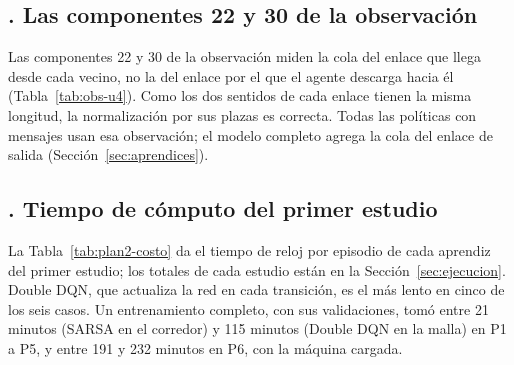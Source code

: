 \subsection*{\theanexoIapartado. Las componentes 22 y 30 de la observación}
\label{sec:componentes-obs}

Las componentes 22 y 30 de la observación miden la cola del enlace que
llega desde cada vecino, no la del enlace por el que el agente descarga
hacia él (Tabla~\ref{tab:obs-u4}). Como los dos sentidos de cada enlace
tienen la misma longitud, la normalización por sus plazas es correcta.
Todas las políticas con mensajes usan esa observación; el modelo
completo agrega la cola del enlace de salida
(Sección~\ref{sec:aprendices}).

\subsection*{\theanexoIapartado. Tiempo de cómputo del primer estudio}
\label{sec:costo-primer-estudio}

La Tabla~\ref{tab:plan2-costo} da el tiempo de reloj por episodio de
cada aprendiz del primer estudio; los totales de cada estudio están en
la Sección~\ref{sec:ejecucion}. Double DQN, que actualiza la red en
cada transición, es el más lento en cinco de los seis casos. Un
entrenamiento completo, con sus validaciones, tomó entre 21 minutos
(SARSA en el corredor) y 115 minutos (Double DQN en la malla) en P1 a
P5, y entre 191 y 232 minutos en P6, con la máquina cargada.

